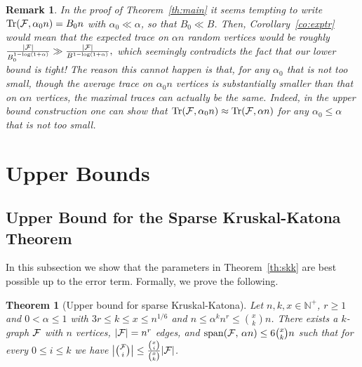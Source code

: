 \documentclass[11pt]{article}
\newtheorem{theo}{Theorem}[section]
\newtheorem*{remark*}{Remark}
\newcommand{\FF}{{\cal F}}
\renewcommand{\wp}{\mathrm{span}}
\renewcommand{\a}{\alpha}
\newcommand{\N}{\mathbb{N}}
\DeclareMathOperator{\trace}{Tr}
\begin{document}
\begin{remark*}
	In the proof of Theorem~\ref{th:main} it seems tempting to write $\trace(\FF,\alpha_0 n) = B_0 n$ with $\alpha_0 \ll \alpha$, so that $B_0 \ll B$. Then, Corollary~\ref{co:exptr} would mean that the expected trace on $\alpha n$ random vertices would be roughly $\frac{|\FF|}{B_0^{1-\log(1+\a)}} \gg \frac{|\FF|}{B^{1-\log(1+\a)}},$ which seemingly contradicts the fact that our lower bound is tight!
	The reason this cannot happen is that, for any $\alpha_0$ that is not too small, though the \emph{average} trace on $\alpha_0 n$ vertices is substantially smaller than that on $\alpha n$ vertices, the \emph{maximal} traces can actually be the same. Indeed, in the upper bound construction one can show that $\trace(\FF,\alpha_0 n) \approx \trace(\FF,\alpha n)$ for any $\alpha_0 \le \alpha$ that is not too small.
\end{remark*}

%


\section{Upper Bounds}%

\subsection{Upper Bound for the Sparse Kruskal-Katona Theorem}\label{sec:sKK-UB}

In this subsection we show that the parameters in Theorem~\ref{th:skk} are best possible up to the error term. Formally, we prove the following. %

\begin{theo}[Upper bound for sparse Kruskal-Katona]\label{theo:sKK-UB}
	Let $n,k,x \in \N^+$, $r \ge 1$ and $0 < \a \le 1$ with 
	$3r \le k \le x \le n^{1/6}$
	and $n \le \a^k n^r \le \binom{x}{k}n$.
	There exists a $k$-graph $\FF$ with $n$ vertices, $|\FF|=n^r$ edges, 
	and 
	$\wp(\FF,\,\a n) \le 6\binom{x}{k}n$
	such that for every $0 \le i \le k$ we have 
	$\big|\binom{\FF}{i}\big| \le \frac{\binom{x}{i}}{\binom{x}{k}}|\FF|$.
\end{theo} 
\end{document}
